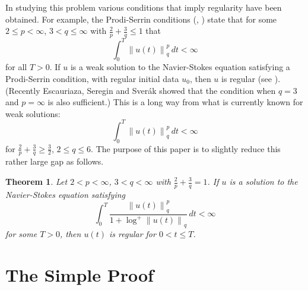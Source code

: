 \documentclass[12pt]{amsart}
\newtheorem{thm}{Theorem}[section]
\theoremstyle{remark}
\newcommand{\smodo}[1]{{\mathopen|#1\mathclose|}}
\newcommand{\snormo}[1]{{\mathopen\|#1\mathclose\|}}
\begin{document}
In studying this problem various conditions that imply regularity
have been obtained.  For example, the 
Prodi-Serrin conditions (\cite{prodi}, \cite{serrin})
state that for some
$2 \le p < \infty$, $3<q\le\infty$ with
$\frac2p + \frac 3q \le 1$ that
$$ \int_0^T \snormo{u(t)}_q^p \, dt < \infty $$
for all $T>0$.
If $u$ is
a weak solution to the Navier-Stokes equation 
satisfying a Prodi-Serrin condition,
with regular initial
data $u_0$, then $u$ is regular (see \cite{sohr}).
(Recently Escauriaza, Seregin and Sver\'ak \cite{escauriaza et al}
showed that the condition when $q=3$ and $p=\infty$ is also sufficient.)
This is a long way from what is currently known for weak
solutions:
$$ \int_0^T \snormo{u(t)}_q^p \, dt < \infty $$
for $\frac2p + \frac 3q \ge \frac32$, $2 \le q \le 6$.
The purpose of this paper is to slightly reduce this rather
large gap as follows.

%

\begin{thm} \label{main}
Let 
$2 < p < \infty$, $3<q < \infty$ with
$\frac2p+\frac3q=1$.
If $u$ is a solution to the Navier-Stokes equation satisfying
$$ \int_0^T \frac{\snormo{u(t)}_q^p}{1+\log^+\snormo{u(t)}_q}
   \, dt < \infty $$
for some $T>0$, 
then $u(t)$ 
is regular for $0 < t\le T$.
\end{thm}

\section{The Simple Proof}
\end{document}

